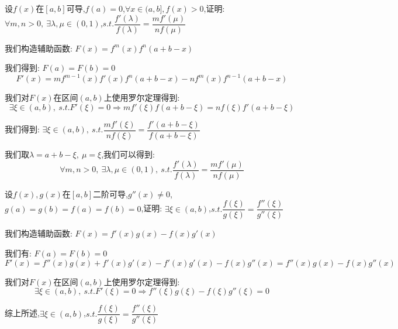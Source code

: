 
\begin{proposition}
	设$f(x)$在$[a,b]$可导,$f(a)=0$,$\forall x\in(a,b],f(x)>0$,证明: $\forall m,n>0,\ \exists \lambda,\mu\in(0,1)$,$s.t. \dfrac{f'(\lambda)}{f(\lambda)}=\dfrac{mf'(\mu)}{nf(\mu)}$
\end{proposition}
\begin{solution}


	我们构造辅助函数: $F(x)=f^{m}(x)f^{n}(a+b-x)$

	我们得到: $F(a)=F(b)=0$
	$$F'(x)=mf^{m-1}(x)f'(x)f^{n}(a+b-x)-nf^{m}(x)f^{n-1}(a+b-x)$$

	我们对$F(x)$在区间$(a,b)$上使用罗尔定理得到:
	$$\exists\xi\in(a,b),\ s.t. F'(\xi)=0\Rightarrow mf'(\xi)f(a+b-\xi)=nf(\xi)f'(a+b-\xi)$$

	我们得到: $\exists\xi\in(a,b),\ s.t. \dfrac{mf'(\xi)}{nf(\xi)}=\dfrac{f'(a+b-\xi)}{f(a+b-\xi)}$

	我们取$\lambda=a+b-\xi,\ \mu=\xi$,我们可以得到:
	$$\forall m,n>0,\ \exists \lambda,\mu\in(0,1),\ s.t. \dfrac{f'(\lambda)}{f(\lambda)}=\dfrac{mf'(\mu)}{nf(\mu)}$$
\end{solution}


\begin{proposition}
	设$f(x),g(x)$在$[a,b]$二阶可导,$g''(x)\neq 0$,$g(a)=g(b)=f(a)=f(b)=0$,证明: $\exists \xi\in(a,b)$,$s.t. \dfrac{f(\xi)}{g(\xi)}=\dfrac{f''(\xi)}{g''(\xi)}$
\end{proposition}
\begin{solution}

	我们构造辅助函数: $F(x)=f'(x)g(x)-f(x)g'(x)$

	我们有: $F(a)=F(b)=0$
	$$F'(x)=f''(x)g(x)+f'(x)g'(x)-f'(x)g'(x)-f(x)g''(x)=f''(x)g(x)-f(x)g''(x)$$

	我们对$F(x)$在区间$(a,b)$上使用罗尔定理得到:
	$$\exists\xi\in(a,b),\ s.t. F'(\xi)=0\Rightarrow f''(\xi)g(\xi)-f(\xi)g''(\xi)=0$$

	综上所述,$\exists \xi\in(a,b)$,$s.t. \dfrac{f(\xi)}{g(\xi)}=\dfrac{f''(\xi)}{g''(\xi)}$
\end{solution}


